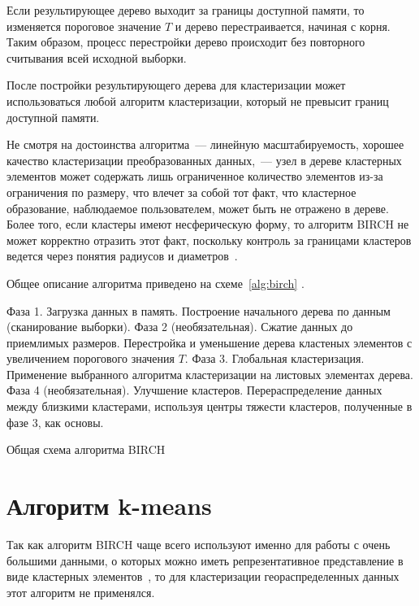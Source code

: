 Если результирующее дерево выходит за границы доступной памяти, то изменяется пороговое значение \( T \) и дерево перестраивается, начиная с корня. Таким образом, процесс перестройки дерево происходит без повторного считывания всей исходной выборки.

После постройки результирующего дерева для кластеризации может использоваться любой алгоритм кластеризации, который не превысит границ доступной памяти.

Не смотря на достоинства алгоритма~--- линейную масштабируемость, хорошее качество кластеризации преобразованных данных,~--- узел в дереве кластерных элементов может содержать лишь ограниченное количество элементов из-за ограничения по размеру, что влечет за собой тот факт, что кластерное образование, наблюдаемое пользователем, может быть не отражено в дереве. Более того, если кластеры имеют несферическую форму, то алгоритм BIRCH не может корректно отразить этот факт, поскольку контроль за границами кластеров ведется через понятия радиусов и диаметров~\cite{cod, birch}.

Общее описание алгоритма приведено на схеме~\ref{alg:birch} \cite[с.~2]{neiskiy}.

\begin{algorithm}
    \DontPrintSemicolon
    Фаза 1. Загрузка данных в память.\;
    Построение начального дерева по данным (сканирование выборки).\;
    Фаза 2 (необязательная). Сжатие данных до приемлимых размеров.\;
    Перестройка и уменьшение дерева кластеных элементов с увеличением порогового значения \( T \).\;
    Фаза 3. Глобальная кластеризация.\;
    Применение выбранного алгоритма кластеризации на листовых элементах дерева.\;
    Фаза 4 (необязательная). Улучшение кластеров.\;
    Перераспределение данных между близкими кластерами, используя центры тяжести кластеров, полученные в фазе 3, как основы.\;
    \caption{Общая схема алгоритма BIRCH}
    \label{alg:birch}
\end{algorithm}

\vspace{-2ex}
\section{Алгоритм k-means} \label{sec:kmeans}
Так как алгоритм BIRCH чаще всего используют именно для работы с очень большими данными, о которых можно иметь репрезентативное представление в виде кластерных элементов~\cite{cod, birch, neiskiy}, то для кластеризации геораспределенных данных этот алгоритм не применялся.

